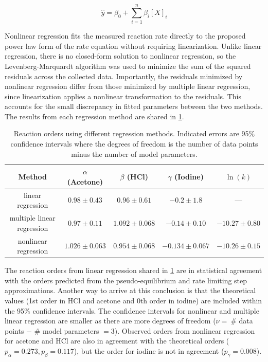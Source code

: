 \documentclass{article}
\begin{document}
\begin{equation}
    \hat{y} = \beta_0 + \sum_{i=1}^{n} \beta_i [X]_i \label{multiplelinear}
\end{equation}

Nonlinear regression fits the measured reaction rate directly to the proposed power law form of the rate equation without requiring linearization. Unlike linear regression, there is no closed-form solution to nonlinear regression, so the Levenberg-Marquardt algorithm  \autocite{levenberg_method_1944, marquardt} was used to minimize the sum of the squared residuals across the collected data. Importantly, the residuals minimized by nonlinear regression differ from those minimized by multiple linear regression, since linearization applies a nonlinear transformation to the residuals. This accounts for the small discrepancy in fitted parameters between the two methods. The results from each regression method are shared in \cref{tab:regressionResults}.



\begin{table}[H]
    \caption{Reaction orders using different regression methods. Indicated errors are 95\% confidence intervals where the degrees of freedom is the number of data points minus the number of model parameters.}
    \centering

    \begin{tabular}{c|cccc}
    \toprule
    Method & $\alpha$ (Acetone) & $\beta$ (HCl) & $\gamma$ (Iodine) & $\ln(k)$ \\
    \midrule
    linear regression & $0.98 \pm 0.43$ & $0.96 \pm 0.61$ & $-0.2 \pm 1.8$ & --- \\
    multiple linear regression & $0.97 \pm 0.11$ & $1.092 \pm 0.068$ & $-0.14 \pm 0.10$ & $-10.27 \pm 0.80$ \\
    nonlinear regression  \autocite{marquardt} & $1.026 \pm 0.063$ & $0.954 \pm 0.068$ & $-0.134 \pm 0.067$ & $-10.26 \pm 0.15$ \\
    \bottomrule
    \end{tabular}
    \label{tab:regressionResults}
\end{table}

The reaction orders from linear regression shared in \cref{tab:regressionResults} are in statistical agreement with the orders predicted from the pseudo-equilibrium and rate limiting step approximations. Another way to arrive at this conclusion is that the theoretical values (1st order in HCl and acetone and 0th order in iodine) are included within the 95\% confidence intervals. The confidence intervals for nonlinear and multiple linear regression are smaller as there are more degrees of freedom ($\nu = \ $\# data points $-$ \# model parameters $=3$). Observed orders from nonlinear regression for  acetone and HCl are also in agreement with the theoretical orders ($p_\alpha = 0.273, p_\beta = 0.117$), but the order for iodine is not in agreement ($ p_\gamma = 0.008$). 
\end{document}
